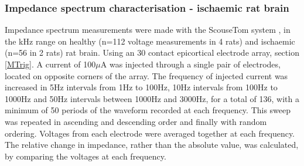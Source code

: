 \subsubsection{Impedance spectrum characterisation - ischaemic rat brain}

Impedance spectrum measurements were made with the ScouseTom system \cite{Dowrick_2015}, in the kHz range on healthy (n=112 voltage measurements in 4 rats) and ischaemic (n=56 in 2 rats) rat brain. Using an 30 contact epicortical electrode array, section \ref{MTrig}. A current of 100$\mu$A was injected through a single pair of electrodes, located on opposite corners of the array. The frequency of injected current was increased in 5Hz intervals from 1Hz to 100Hz, 10Hz intervals from 100Hz to 1000Hz and 50Hz intervals between 1000Hz and 3000Hz, for a total of 136, with a minimum of 50 periods of the waveform recorded at each frequency. This sweep was repeated in ascending and descending order and finally with random ordering. Voltages from each electrode were averaged together at each frequency. The relative change in impedance, rather than the absolute value, was calculated, by comparing the voltages at each frequency.